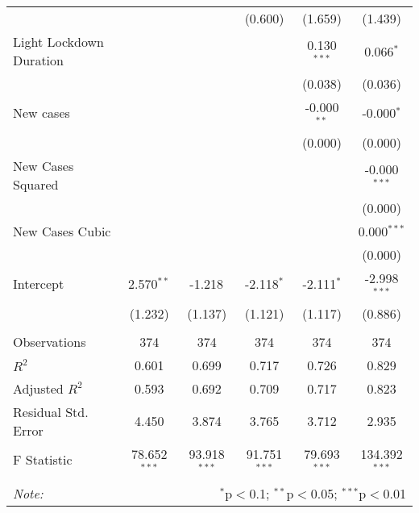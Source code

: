 \begin{tabular}{@{\extracolsep{5pt}}lccccc}
  & & & (0.600) & (1.659) & (1.439) \\
 Light Lockdown Duration & & & & 0.130$^{***}$ & 0.066$^{*}$ \\
  & & & & (0.038) & (0.036) \\
 New cases & & & & -0.000$^{**}$ & -0.000$^{*}$ \\
  & & & & (0.000) & (0.000) \\
 New Cases Squared & & & & & -0.000$^{***}$ \\
  & & & & & (0.000) \\
 New Cases Cubic & & & & & 0.000$^{***}$ \\
  & & & & & (0.000) \\
 Intercept & 2.570$^{**}$ & -1.218$^{}$ & -2.118$^{*}$ & -2.111$^{*}$ & -2.998$^{***}$ \\
  & (1.232) & (1.137) & (1.121) & (1.117) & (0.886) \\
\hline \\[-1.8ex]
 Observations & 374 & 374 & 374 & 374 & 374 \\
 $R^2$ & 0.601 & 0.699 & 0.717 & 0.726 & 0.829 \\
 Adjusted $R^2$ & 0.593 & 0.692 & 0.709 & 0.717 & 0.823 \\
 Residual Std. Error & 4.450 & 3.874 & 3.765 & 3.712 & 2.935  \\
 F Statistic & 78.652$^{***}$  & 93.918$^{***}$  & 91.751$^{***}$  & 79.693$^{***}$  & 134.392$^{***}$  \\
\hline
\hline \\[-1.8ex]
\textit{Note:} & \multicolumn{5}{r}{$^{*}$p$<$0.1; $^{**}$p$<$0.05; $^{***}$p$<$0.01} \\
\end{tabular}
